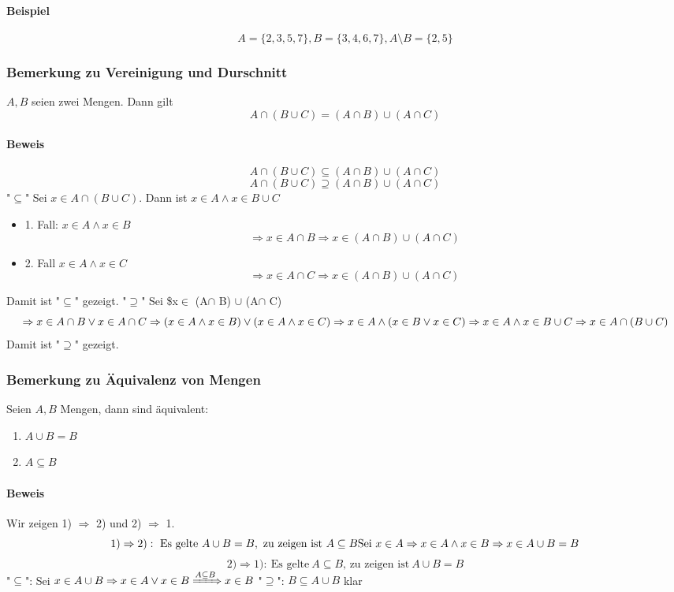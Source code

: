 \documentclass[a4paper]{scrartcl}
\begin{document}
\paragraph{Beispiel}
\label{sec-2-4-8-1}
\[A=\{2,3,5,7\}, B=\{3,4,6,7\}, A\setminus B = \{2,5\}\]
\subsubsection{Bemerkung zu Vereinigung und Durschnitt}
\label{sec-2-4-9}
$A,B$ seien zwei Mengen. Dann gilt \[A\cap (B\cup C) = (A\cap B) \cup (A\cap C)\]
\paragraph{Beweis}
\label{sec-2-4-9-1}
\[A\cap(B\cup C) \subseteq (A\cap B) \cup (A\cap C)\]
\[A\cap(B\cup C) \supseteq (A\cap B) \cup (A\cap C)\]
"$\subseteq$" Sei $x\in A \cap (B\cup C)$. Dann ist $x\in A \wedge x\in B\cup C$
\begin{itemize}
\item 1. Fall: $x\in A \wedge x\in B$
       \[\Rightarrow x\in A\cap B \Rightarrow x \in (A\cap B) \cup (A\cap C)\]
\item 2. Fall $x\in A \wedge x\in C$
       \[\Rightarrow x\in A\cap C \Rightarrow x\in (A\cap B)\cup(A\cap C)\]
\end{itemize}
Damit ist "$\subseteq$" gezeigt.
"$\supseteq$" Sei \$x$\in$ (A$\cap$ B) $\cup$ (A$\cap$ C)
\[\Rightarrow x\in A\cap B \vee x\in A\cap C \\ \Rightarrow (x\in A \wedge x\in B) \vee (x\in A \wedge x\in C) \\ \Rightarrow x\in A \wedge (x\in B\vee x\in C) \\ \Rightarrow x\in A \wedge x\in B\cup C \\ \Rightarrow x\in A\cap (B\cup C)\]
Damit ist "$\supseteq$" gezeigt.
\subsubsection{Bemerkung zu Äquivalenz von Mengen}
\label{sec-2-4-10}
Seien $A,B$ Mengen, dann sind äquivalent:
\begin{enumerate}
\item $A\cup B = B$
\item $A\subseteq B$
\end{enumerate}
\paragraph{Beweis}
\label{sec-2-4-10-1}
Wir zeigen 1) $\Rightarrow$ 2) und 2) $\Rightarrow$ 1.
\[1) \Rightarrow 2):~\text{Es gelte}~A\cup B = B,~\text{zu zeigen ist}~A\subseteq B \\ \text{Sei}~x\in A \Rightarrow x\in A \wedge x \in B \Rightarrow x\in A\cup B = B\]
\[2) \Rightarrow 1):~\text{Es gelte}~A\subseteq B\text{, zu zeigen ist}~A\cup B = B \]
"$\subseteq$": Sei $x\in A\cup B \Rightarrow x\in A \vee x\in B \xRightarrow{A\subseteq B} x\in B$
"$\supseteq$": $B\subseteq A\cup B$ klar
\end{document}
